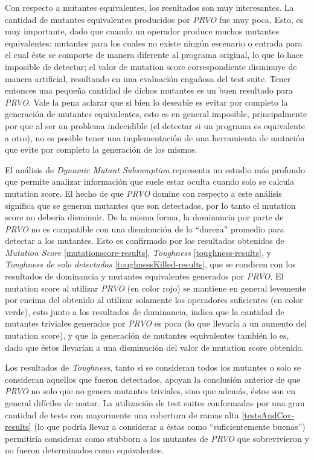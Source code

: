 Con respecto a mutantes equivalentes, los resultados son muy interesantes. La cantidad de mutantes equivalentes producidos por \emph{PRVO} fue muy poca. Esto, es muy importante, dado que cuando un operador produce muchos mutantes equivalentes: mutantes para los cuales no existe ning\'un escenario o entrada para el cual \'este se comporte de manera diferente al programa original, lo que lo hace imposible de detectar; el valor de mutation score correspondiente disminuye de manera artificial, resultando en una evaluaci\'on enga\~nosa del test suite. Tener entonces una peque\~na cantidad de dichos mutantes es un buen resultado para \emph{PRVO}. Vale la pena aclarar que si bien lo deseable es evitar por completo la generaci\'on de mutantes equivalentes, esto es en general imposible, principalmente por que al ser un problema indecidible (el detectar si un programa es equivalente a otro), no es posible tener una implementaci\'on de una herramienta de mutaci\'on que evite por completo la generaci\'on de los mismos.

El an\'alisis de \emph{Dynamic Mutant Subsumption} representa un estudio m\'as profundo que permite analizar informaci\'on que suele estar oculta cuando solo se calcula mutation score. El hecho de que \emph{PRVO} domine con respecto a este an\'alisis significa que se generan mutantes que son detectados, por lo tanto el mutation score no deber\'ia disminuir. De la misma forma, la dominancia por parte de \emph{PRVO} no es compatible con una disminuci\'on de la ``dureza'' promedio para detectar a los mutantes. Esto es confirmado por los resultados obtenidos de \emph{Mutation Score} \ref{mutationscore-results}, \emph{Toughness} \ref{toughness-results}, y \emph{Toughness de solo detectados} \ref{toughnessKilled-results}, que se condicen con los resultados de dominancia y mutantes equivalentes generados por \emph{PRVO}. El mutation score al utilizar \emph{PRVO} (en color rojo) se mantiene en general levemente por encima del obtenido al utilizar solamente los operadores suficientes (en color verde), esto junto a los resultados de dominancia, indica que la cantidad de mutantes triviales generados por \emph{PRVO} es poca (lo que llevar\'ia a un aumento del mutation score), y que la generaci\'on de mutantes equivalentes tambi\'en lo es, dado que \'estos llevar\'ian a una disminuci\'on del valor de mutation score obtenido.

Los resultados de \emph{Toughness}, tanto si se consideran todos los mutantes o solo se consideran aquellos que fueron detectados, apoyan la conclusi\'on anterior de que \emph{PRVO} no solo que no genera mutantes triviales, sino que adem\'as, \'estos son en general dif\'iciles de matar. La utilizaci\'on de test suites conformadas por una gran cantidad de tests con mayormente una cobertura de ramas alta \ref{testsAndCov-results} (lo que podr\'ia llevar a considerar a \'estas como ``suficientemente buenas'') permitir\'ia considerar como stubborn a los mutantes de \emph{PRVO} que sobrevivieron y no fueron determinados como equivalentes.

